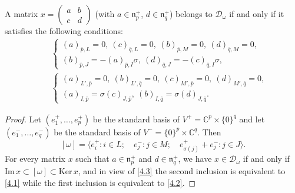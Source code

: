 \documentclass[ALCO,Unicode]{cedram}
\newcommand{\fn}{\mathfrak{n}}
\newcommand{\Span}[1]{\langle #1\rangle}
\newcommand{\subm}[2]{(#1)_{#2}}
\newcommand{\condir}{\mathcal{D}}
\newcommand{\intp}{\overline{p}}
\newcommand{\intq}{\overline{q}}
\newcommand{\mC}{\mathbb{C}}
\begin{document}
\begin{lemma}
\label{L4.2}
A matrix $x=\begin{pmatrix} a & b\\ c & d \end{pmatrix}$ \textup{(}with $a\in\fn_p^+$, $d\in\fn_q^+$\textup{)} belongs to $\mathcal{D}_\omega$ if and only if it satisfies the following conditions:
\begin{eqnarray}
&& \left\{\begin{array}{c} \subm{a}{\intp,L}=0,\ \subm{c}{\intq,L}=0,\ \subm{b}{\intp,M}=0,\ \subm{d}{\intq,M}=0,\\[1.5mm]
{} \subm{b}{\intp,J}=-\subm{a}{\intp,I}\sigma,\ \subm{d}{\intq,J}=-\subm{c}{\intq,I}\sigma, \end{array}\right. \label{4.1}\\[2mm]
&& \left\{\begin{array}{c} \subm{a}{L',\intp}=0,\ \subm{b}{L',\intq}=0,\ \subm{c}{M',\intp}=0,\ \subm{d}{M',\intq}=0,\\[1.5mm]
{} \subm{a}{I,\intp}=\sigma \subm{c}{J,\intp},\ \subm{b}{I,\intq}=\sigma\subm{d}{J,\intq}.
\end{array}\right. \label{4.2}
\end{eqnarray}
\end{lemma}

\begin{proof}
Let $(e_1^+,\ldots,e_p^+)$ be the standard basis of $V^+=\mC^p\times\{0\}^q$ and let $(e_1^-,\ldots,e_q^-)$ be the standard basis of $V^-=\{0\}^p\times\mC^q$. Then
\begin{equation}
\label{4.3}
[\omega]=\Span{e_i^+:i\in L;\quad e_j^-:j\in M;\quad e_{\sigma(j)}^++e_j^-:j\in J}.
\end{equation}
For every matrix $x$ such that $a\in\fn_p^+$ and $d\in\fn_q^+$, we have $x\in\condir_\omega$ if and only if $\mathrm{Im}\,x\subset[\omega]\subset \mathrm{Ker}\,x$, and in view of \eqref{4.3} the second inclusion is equivalent to \eqref{4.1} while the first inclusion is equivalent to \eqref{4.2}.
\end{proof}
\end{document}
